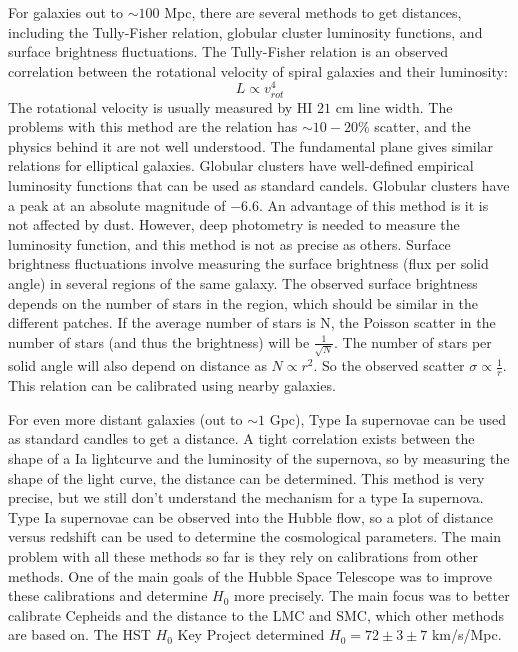 For galaxies out to $\sim100$ Mpc, there are several methods to get distances, 
including the Tully-Fisher relation, globular cluster  
luminosity functions, and surface brightness fluctuations.  The Tully-Fisher 
relation is an observed correlation between the rotational velocity of 
spiral galaxies and their luminosity:
\begin{equation}
L\propto v_{rot}^4
\end{equation}
The rotational velocity is usually measured by HI $21$ cm line width.  The 
problems with this method are the relation has $\sim10-20$\% scatter, and 
the physics behind it are not well understood.  The fundamental plane gives 
similar relations for elliptical galaxies.  Globular clusters have well-defined empirical luminosity functions that can be used as 
standard candels.  Globular clusters have a peak at an absolute magnitude 
of $-6.6$.  An advantage of this method is it is not affected by dust.  
However, deep photometry is needed to measure the luminosity function, and 
this method is not as precise as others.  Surface brightness fluctuations 
involve measuring the surface brightness (flux per solid angle) in several 
regions of the same galaxy.  The observed surface brightness depends on the 
number of stars in the region, which should be similar in the different 
patches.  If the average number of stars is N, the Poisson scatter in the 
number of stars (and thus the brightness) will be $\frac{1}{\sqrt{N}}$.  
The number of stars per solid angle will also depend on distance as 
$N\propto r^2$.  So the observed scatter $\sigma\propto\frac{1}{r}$.  This 
relation can be calibrated using nearby galaxies.   

For even more distant galaxies (out to $\sim1$ Gpc), Type Ia supernovae 
can be used as standard candles to get a distance.  A tight correlation 
exists between the shape of a Ia lightcurve and the luminosity of the 
supernova, so by measuring the shape of the light curve, the distance can 
be determined.  This method is very precise, but we still don't understand 
the mechanism for a type Ia supernova.  Type Ia supernovae can be observed 
into the Hubble flow, so a plot of distance versus redshift can be used 
to determine the cosmological parameters.  The main problem with all these 
methods so far is they rely on calibrations from other methods.  One of the 
main goals of the Hubble Space Telescope was to improve these calibrations 
and determine $H_0$ more precisely.  The main focus was to better calibrate 
Cepheids and the distance to the LMC and SMC, which other methods are based 
on.  The HST $H_0$ Key Project determined $H_0=72\pm3\pm7$ km/s/Mpc.

